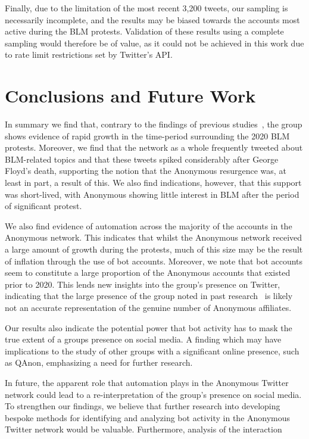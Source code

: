 \documentclass[letterpaper]{article}
\begin{document}
Finally, due to the limitation of the most recent 3,200 tweets, our sampling is necessarily incomplete, and the results may be biased towards the accounts most active during the BLM protests. Validation of these results using a complete sampling would therefore be of value, as it could not be achieved in this work due to rate limit restrictions set by Twitter's API.

\vspace{-1.97mm}
\section{Conclusions and Future Work}

In summary we find that, contrary to the findings of previous studies~\cite{Jones2020,Uitermark2017}, the group shows evidence of rapid growth in the time-period surrounding the 2020 BLM protests. Moreover, we find that the network as a whole frequently tweeted about BLM-related topics and that these tweets spiked considerably after George Floyd's death, supporting the notion that the Anonymous resurgence was, at least in part, a result of this. We also find indications, however, that this support was short-lived, with Anonymous showing little interest in BLM after the period of significant protest.

We also find evidence of automation across the majority of the accounts in the Anonymous network. This indicates that whilst the Anonymous network received a large amount of growth during the protests, much of this size may be the result of inflation through the use of bot accounts. Moreover, we note that bot accounts seem to constitute a large proportion of the Anonymous accounts that existed prior to 2020. This lends new insights into the group's presence on Twitter, indicating that the large presence of the group noted in past research~\cite{Jones2020} is likely not an accurate representation of the genuine number of Anonymous affiliates.

Our results also indicate the potential power that bot activity has to mask the true extent of a groups presence on social media. A finding which may have implications to the study of other groups with a significant online presence, such as QAnon, emphasizing a need for further research.

In future, the apparent role that automation plays in the Anonymous Twitter network could lead to a re-interpretation of the group's presence on social media. To strengthen our findings, we believe that further research into developing bespoke methods for identifying and analyzing bot activity in the Anonymous Twitter network would be valuable. Furthermore, analysis of the interaction


\fontsize{9.0pt}{10.0pt}
\selectfont
\clearpage

\end{document}
